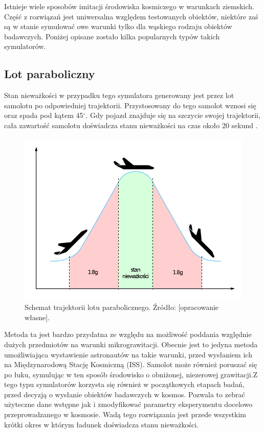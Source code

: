 Istnieje wiele sposobów imitacji środowiska kosmiczego w warunkach ziemskich. Część z
 rozwiązań jest uniwersalna względem testowanych obiektów, niektóre zaś \\są w stanie
  symulować owe warunki tylko dla wąskiego rodzaju obiektów badawczych. Poniżej opisane
   zostało kilka popularnych typów takich symulatorów.

\subsection{Lot paraboliczny}

Stan nieważkości w przypadku tego symulatora generowany jest przez lot samolotu po
 odpowiedniej trajektorii. Przystosowany do tego samolot wznosi się oraz spada pod kątem
  45$^\circ$. Gdy pojazd znajduje się na szczycie swojej trajektorii, cała zawartość
   samolotu doświadcza stanu nieważkości na czas około 20 sekund
    \cite{bib:lot_paraboliczny}.\begin{figure}[h]
	
	\centering
	\includegraphics[scale=1.3]{lot_para_sch.jpg}
	\caption{Schemat trajektorii lotu parabolicznego. Źródło: [opracowanie własne].}
	\label{fig:paraboliczny}
	
\end{figure} Metoda ta jest bardzo przydatna ze względu na możliwość poddania względnie dużych
 przedmiotów na warunki mikrograwitacji. Obecnie jest to jedyna metoda umożliwiająca
  wystawienie astronautów na takie warunki, przed wysłaniem ich na Międzynarodową Stację
   Kosmiczną (ISS)\cite{bib:lot_paraboliczny}. Samolot może również poruszać się po
    łuku, symulując w ten sposób środowisko o obniżonej, niezerowej grawitacji.\linebreak Z tego
     typu symulatorów korzysta się również w początkowych etapach badań, przed decyzją o
      wysłanie obiektów badawczych w kosmos. Pozwala to zebrać użyteczne dane wstępne
       jak i zmodyfikować parametry eksperymentu docelowo przeprowadzanego w kosmosie.
        Wadą tego rozwiązania jest przede wszystkim krótki okres w którym ładunek
         doświadcza stanu nieważkości.

